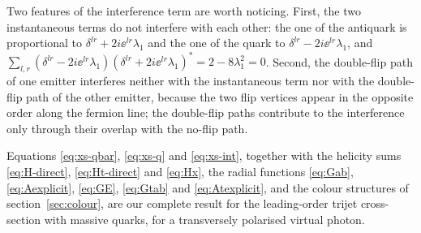 Two features of the interference term are worth noticing. First, the two instantaneous terms do not
interfere with each other: the one of the antiquark is proportional to
$\delta^{lr}+2i\ee^{lr}\lambda_1$ and the one of the quark to $\delta^{lr}-2i\ee^{lr}\lambda_1$, and
$\sum_{l,r}(\delta^{lr}-2i\ee^{lr}\lambda_1)(\delta^{lr}+2i\ee^{lr}\lambda_1)^*=2-8\lambda_1^2=0$. Second,
the double-flip path of one emitter interferes neither with the instantaneous term nor with the
double-flip path of the other emitter, because the two flip vertices appear in the opposite order
along the fermion line; the double-flip paths contribute to the interference only through their
overlap with the no-flip path.

Equations \eqref{eq:xs-qbar}, \eqref{eq:xs-q} and \eqref{eq:xs-int}, together with the helicity sums
\eqref{eq:H-direct}, \eqref{eq:Ht-direct} and \eqref{eq:Hx}, the radial functions
\eqref{eq:Gab}, \eqref{eq:Aexplicit}, \eqref{eq:GE}, \eqref{eq:Gtab} and \eqref{eq:Atexplicit}, and the
colour structures of section~\ref{sec:colour}, are our complete result for the leading-order trijet
cross-section with massive quarks, for a transversely polarised virtual photon.
